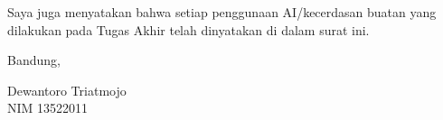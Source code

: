 \begin{singlespace}
\vspace{0.6cm}

\noindent Saya juga menyatakan bahwa setiap penggunaan AI/kecerdasan buatan yang dilakukan pada Tugas Akhir telah dinyatakan di dalam surat ini.

\begin{flushright}
  \vspace{0.75cm}
  Bandung, \tanggalpengesahan

  \vspace{1.75cm}

  Dewantoro Triatmojo \\
  NIM 13522011
\end{flushright}

\end{singlespace}

\clearpage
